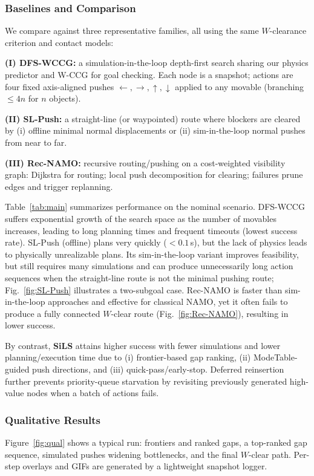 \subsubsection{Baselines and Comparison}
\label{subsec:baselines}
We compare against three representative families, all using the same $W$-clearance criterion and contact models:

\textbf{(I) DFS-WCCG:} a simulation-in-the-loop depth-first search sharing our physics predictor and W-CCG for goal checking. Each node is a snapshot; actions are four fixed axis-aligned pushes ${\leftarrow,\rightarrow,\uparrow,\downarrow}$ applied to any movable (branching $\le 4n$ for $n$ objects).

\textbf{(II) SL-Push:} a straight-line (or waypointed) route where blockers are cleared by (i) offline minimal normal displacements or (ii) sim-in-the-loop normal pushes from near to far.

\textbf{(III) Rec-NAMO:} recursive routing/pushing on a cost-weighted visibility graph: Dijkstra for routing; local push decomposition for clearing; failures prune edges and trigger replanning.

Table~\ref{tab:main} summarizes performance on the nominal scenario. DFS-WCCG suffers exponential growth of the search space as the number of movables increases, leading to long planning times and frequent timeouts (lowest success rate). SL-Push (offline) plans very quickly ($<0.1$\,s), but the lack of physics leads to physically unrealizable plans. Its sim-in-the-loop variant improves feasibility, but still requires many simulations and can produce unnecessarily long action sequences when the straight-line route is not the minimal pushing route; Fig.~\ref{fig:SL-Push} illustrates a two-subgoal case. Rec-NAMO is faster than sim-in-the-loop approaches and effective for classical NAMO, yet it often fails to produce a fully connected $W$-clear route (Fig.~\ref{fig:Rec-NAMO}), resulting in lower success. 

By contrast, \textbf{SiLS} attains higher success with fewer simulations and lower planning/execution time due to (i) frontier-based gap ranking, (ii) ModeTable-guided push directions, and (iii) quick-pass/early-stop. Deferred reinsertion further prevents priority-queue starvation by revisiting previously generated high-value nodes when a batch of actions fails.



\subsubsection{Qualitative Results}
\label{subsec:qual}
Figure~\ref{fig:qual} shows a typical run: frontiers and ranked gaps, a top-ranked gap sequence, simulated pushes widening bottlenecks, and the final $W$-clear path. Per-step overlays and GIFs are generated by a lightweight snapshot logger.

